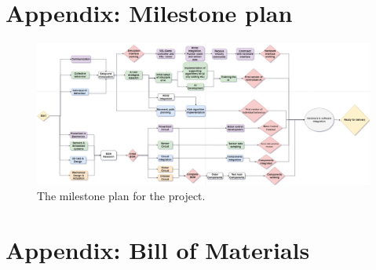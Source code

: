 \appendix


\section{Appendix: Milestone plan}
\label{appendix:milestone_plan}

\begin{figure}
    \centering
    \includegraphics[width=\linewidth]{images/MileStone.png}
    \caption{The milestone plan for the project.}
    \label{fig:mile_stone} 
\end{figure}


\section{Appendix: Bill of Materials}
\label{appendix:bom}

